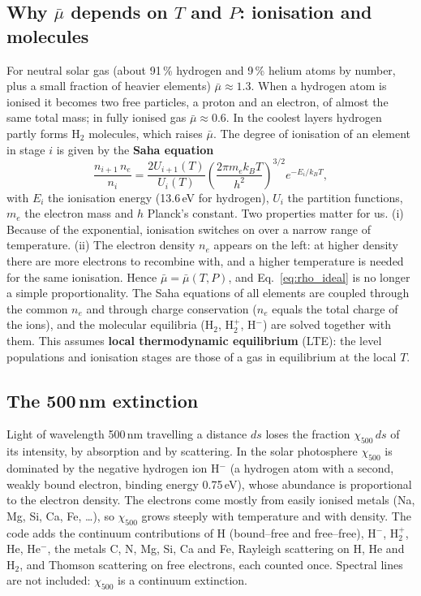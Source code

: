 \subsection{\texorpdfstring{Why $\bar\mu$ depends on $T$ and $P$}{Why the mean molecular weight depends on T and P}: ionisation and molecules}
For neutral solar gas (about 91\,\% hydrogen and 9\,\% helium atoms by number, plus a small fraction of heavier elements)
$\bar\mu\approx1.3$. When a hydrogen atom is ionised it becomes two free particles, a proton and an electron, of almost
the same total mass; in fully ionised gas $\bar\mu\approx0.6$. In the coolest layers hydrogen partly forms H$_2$ molecules,
which raises $\bar\mu$. The degree of ionisation of an element in stage $i$ is given by the \textbf{Saha equation}
\begin{equation}
\frac{n_{i+1}\,n_e}{n_i}=\frac{2U_{i+1}(T)}{U_i(T)}\left(\frac{2\pi m_ek_BT}{h^2}\right)^{3/2}e^{-E_i/k_BT},\label{eq:saha}
\end{equation}
with $E_i$ the ionisation energy (13.6\,eV for hydrogen), $U_i$ the partition functions, $m_e$ the electron mass and $h$
Planck's constant. Two properties matter for us. (i) Because of the exponential, ionisation switches on over a narrow
range of temperature. (ii) The electron density $n_e$ appears on the left: at higher density there are more electrons to
recombine with, and a higher temperature is needed for the same ionisation. Hence $\bar\mu=\bar\mu(T,P)$, and
Eq.~\eqref{eq:rho_ideal} is no longer a simple proportionality. The Saha equations of all elements are coupled through the
common $n_e$ and through charge conservation ($n_e$ equals the total charge of the ions), and the molecular equilibria
(H$_2$, H$_2^+$, H$^-$) are solved together with them. This assumes \textbf{local thermodynamic equilibrium} (LTE): the
level populations and ionisation stages are those of a gas in equilibrium at the local $T$.

\subsection{\texorpdfstring{The 500\,nm extinction}{The 500 nm extinction}}
Light of wavelength 500\,nm travelling a distance $ds$ loses the fraction $\chi_{500}\,ds$ of its intensity, by absorption
and by scattering. In the solar photosphere $\chi_{500}$ is dominated by the negative hydrogen ion H$^-$ (a hydrogen atom
with a second, weakly bound electron, binding energy 0.75\,eV), whose abundance is proportional to the electron density.
The electrons come mostly from easily ionised metals (Na, Mg, Si, Ca, Fe, \dots), so $\chi_{500}$ grows steeply with
temperature and with density. The code adds the continuum contributions of H (bound--free and free--free), H$^-$,
H$_2^+$, He, He$^-$, the metals C, N, Mg, Si, Ca and Fe, Rayleigh scattering on H, He and H$_2$, and Thomson scattering
on free electrons, each counted once. Spectral lines are not included: $\chi_{500}$ is a continuum extinction.

